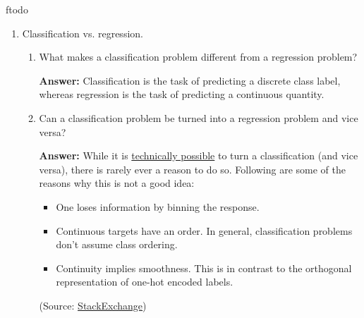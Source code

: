 ƒtodo\documentclass{article}
\newenvironment{QandA}{\begin{enumerate}[label=\arabic*.]}{\end{enumerate}}
\newenvironment{InnerQandA}{\begin{enumerate}[label=\roman*.]}{\end{enumerate}}
\newenvironment{answer}{\par\normalfont \textbf{Answer:}}{}
\begin{document}
\begin{QandA}
\begin{InnerQandA}
\begin{answer}
        

        (Source: \href{https://ekamperi.github.io/machine%20learning/2021/05/08/bayesian-optimization.html}{Stathis Kamperis's blog})
        \end{answer}
    \end{InnerQandA}

    \item Classification vs. regression.
    \begin{InnerQandA}
        \item What makes a classification problem different from a regression problem? 
        \begin{answer}
            Classification is the task of predicting a discrete class label, whereas regression is the task of predicting a continuous quantity.
        \end{answer}

        \item Can a classification problem be turned into a regression problem and vice versa?
        \begin{answer}
            While it is \href{https://machinelearningmastery.com/classification-versus-regression-in-machine-learning/}{technically possible} to turn a classification (and vice versa), there is rarely ever a reason to do so. Following are some of the reasons why this is not a good idea:
            \begin{itemize}
                \item One loses information by binning the response. 
                \item Continuous targets have an order. In general, classification problems don't assume class ordering.
                \item Continuity implies smoothness. This is in contrast to the orthogonal representation of one-hot encoded labels.
            \end{itemize}
            (Source: \href{https://stats.stackexchange.com/questions/565537/is-there-ever-a-reason-to-solve-a-regression-problem-as-a-classification-problem}{StackExchange})
        \end{answer}
    \end{InnerQandA}
    

\end{QandA}
\end{document}
